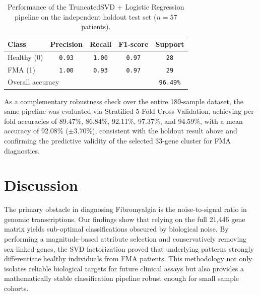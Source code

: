 \documentclass[twocolumn]{article}
\begin{document}
\begin{table}[h]
    \centering
    \caption{Performance of the TruncatedSVD + Logistic Regression pipeline on the independent holdout test set ($n=57$ patients).}
    \label{tab:holdout}
    \begin{tabular}{lcccc}
        \toprule
        Class & Precision & Recall & F1-score & Support \\
        \midrule
        Healthy (0) & \texttt{0.93} & \texttt{1.00} & \texttt{0.97} & \texttt{28} \\
        FMA (1)     & \texttt{1.00} & \texttt{0.93} & \texttt{0.97} & \texttt{29} \\
        \midrule
        \multicolumn{4}{l}{Overall accuracy} & \texttt{96.49\%} \\
        \bottomrule
    \end{tabular}
\end{table}

As a complementary robustness check over the entire 189-sample dataset, the same pipeline was evaluated via Stratified 5-Fold Cross-Validation, achieving per-fold accuracies of 89.47\%, 86.84\%, 92.11\%, 97.37\%, and 94.59\%, with a mean accuracy of 92.08\% ($\pm$3.70\%), consistent with the holdout result above and confirming the predictive validity of the selected 33-gene cluster for FMA diagnostics.


\section{Discussion}
The primary obstacle in diagnosing Fibromyalgia is the noise-to-signal ratio in genomic transcriptions. Our findings show that relying on the full 21,446 gene matrix yields sub-optimal classifications obscured by biological noise. By performing a magnitude-based attribute selection and conservatively removing sex-linked genes, the SVD factorization proved that underlying patterns strongly differentiate healthy individuals from FMA patients. This methodology not only isolates reliable biological targets for future clinical assays but also provides a mathematically stable classification pipeline robust enough for small sample cohorts.
\end{document}

